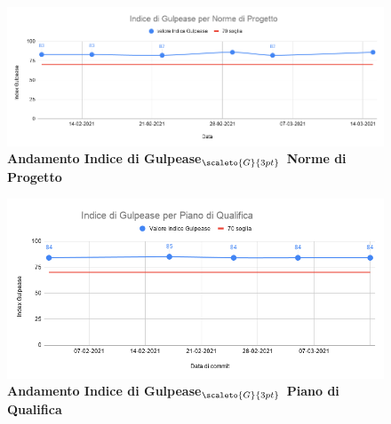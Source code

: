 {{{\begin{figure}[H]
	\begin{center}
		\includegraphics[width=1\linewidth]{../immagini/gulpeaseRP/IndicediGulpeaseperNormediProgetto.png}
		\caption{\textbf{Andamento Indice di Gulpease$_{\scaleto{G}{3pt}}$ Norme di Progetto}}
	\end{center}
\end{figure}

\begin{figure}[H]
	\begin{center}
		\includegraphics[width=0.9\linewidth]{../immagini/gulpeaseRP/indPdQ2.png}
		\caption{\textbf{Andamento Indice di Gulpease$_{\scaleto{G}{3pt}}$ Piano di Qualifica}}
	\end{center}
\end{figure}


}}}

